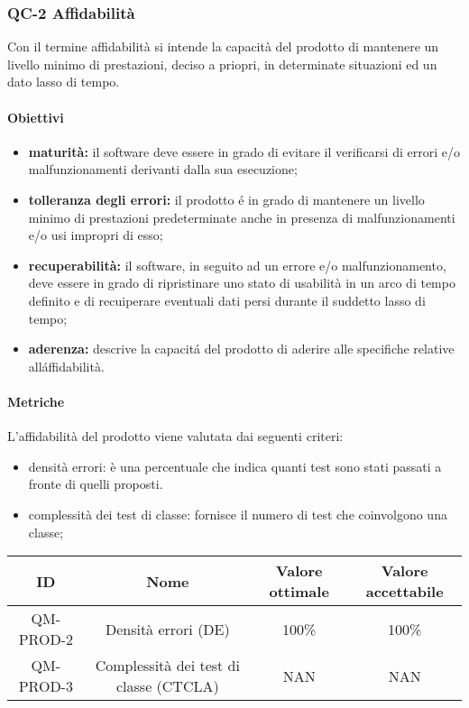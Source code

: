 \subsubsection{QC-2 Affidabilità}
Con il termine affidabilità si intende la capacità del prodotto di mantenere un livello minimo di prestazioni, deciso a priopri, in determinate situazioni ed un dato lasso di tempo.
	\paragraph{Obiettivi}
		\begin{itemize}
			\item \textbf{maturità:} il software deve essere in grado di evitare il verificarsi di errori e/o malfunzionamenti derivanti dalla sua esecuzione;
			\item \textbf{tolleranza degli errori:} il prodotto é in grado di mantenere un livello minimo di prestazioni predeterminate anche in presenza di malfunzionamenti e/o usi impropri di esso;
			\item \textbf{recuperabilità:} il software, in seguito ad un errore e/o malfunzionamento, deve essere in grado di ripristinare uno stato di usabilità in un arco di tempo definito e di recuiperare eventuali dati persi durante il suddetto lasso di tempo;
			\item \textbf{aderenza:} descrive la capacitá del prodotto di aderire alle specifiche relative alláffidabilità.
		\end{itemize}
	\paragraph{Metriche}
	L'affidabilità del prodotto viene valutata dai seguenti criteri:
	\begin{itemize}
		\item densità errori: è una percentuale che indica quanti test sono stati passati a fronte di quelli proposti.
		\item complessità dei test di classe: fornisce il numero di test che coinvolgono una classe;
	\end{itemize}
	\begin{center}	
		\begin{tabular}{|c|c|c|c|}
			\rowcolor{lighter-grayer}
			\hline
			ID & Nome & Valore ottimale & Valore accettabile \\
			\hline
			QM-PROD-2 & Densità errori (DE) & 100\% & 100\% \\
			\hline
			QM-PROD-3 & Complessità dei test di classe (CTCLA) & NAN & NAN \\
			\hline
		\end{tabular}
	\end{center}
